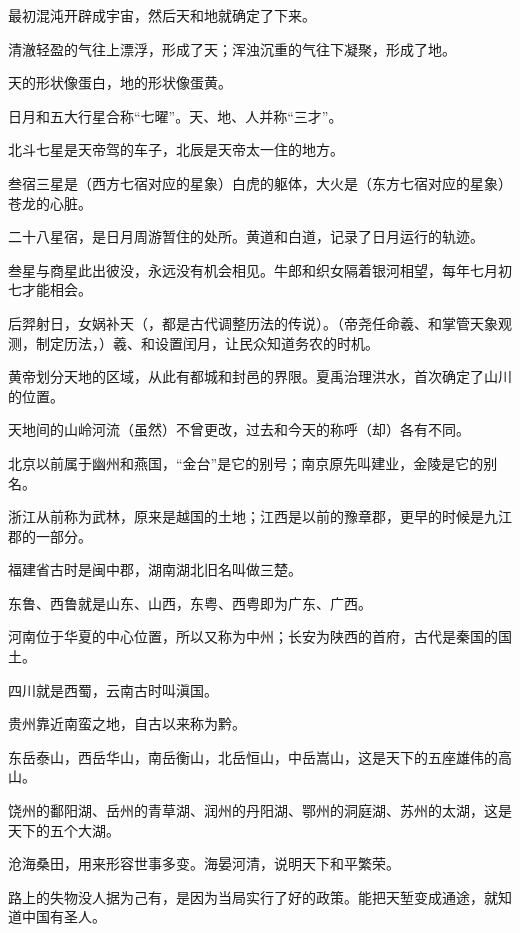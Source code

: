 \documentclass[12pt,UTF-8,openany,a4]{ctexbook}
\begin{document}
\begin{large}
    \yiwen 
    最初混沌开辟成宇宙，然后天和地就确定了下来。
    
    清澈轻盈的气往上漂浮，形成了天；浑浊沉重的气往下凝聚，形成了地。
    
    天的形状像蛋白，地的形状像蛋黄。
    
    日月和五大行星合称“七曜”。天、地、人并称“三才”。
    
    北斗七星是天帝驾的车子，北辰是天帝太一住的地方。
    
    叁宿三星是（西方七宿对应的星象）白虎的躯体，大火是（东方七宿对应的星象）苍龙的心脏。
    
    二十八星宿，是日月周游暂住的处所。黄道和白道，记录了日月运行的轨迹。
    
    叁星与商星此出彼没，永远没有机会相见。牛郎和织女隔着银河相望，每年七月初七才能相会。
    
    后羿射日，女娲补天（，都是古代调整历法的传说）。（帝尧任命羲、和掌管天象观测，制定历法，）羲、和设置闰月，让民众知道务农的时机。
    
    黄帝划分天地的区域，从此有都城和封邑的界限。夏禹治理洪水，首次确定了山川的位置。
    
    天地间的山岭河流（虽然）不曾更改，过去和今天的称呼（却）各有不同。
    
    北京以前属于幽州和燕国，“金台”是它的别号；南京原先叫建业，金陵是它的别名。
    
    浙江从前称为武林，原来是越国的土地；江西是以前的豫章郡，更早的时候是九江郡的一部分。
    
    福建省古时是闽中郡，湖南湖北旧名叫做三楚。
    
    东鲁、西鲁就是山东、山西，东粤、西粤即为广东、广西。
    
    河南位于华夏的中心位置，所以又称为中州；长安为陕西的首府，古代是秦国的国土。
    
    四川就是西蜀，云南古时叫滇国。
    
    贵州靠近南蛮之地，自古以来称为黔。
    
    东岳泰山，西岳华山，南岳衡山，北岳恒山，中岳嵩山，这是天下的五座雄伟的高山。
    
    饶州的鄱阳湖、岳州的青草湖、润州的丹阳湖、鄂州的洞庭湖、苏州的太湖，这是天下的五个大湖。
    
    沧海桑田，用来形容世事多变。海晏河清，说明天下和平繁荣。
    
    路上的失物没人据为己有，是因为当局实行了好的政策。能把天堑变成通途，就知道中国有圣人。
    
\end{large}
\end{document}
